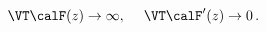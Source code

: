 \begin{equation}
 \VT \calF(z) \to \infty, \hspace{3ex}
 \VT \calF'(z) \to 0\,. \label{region3}
\end{equation}

